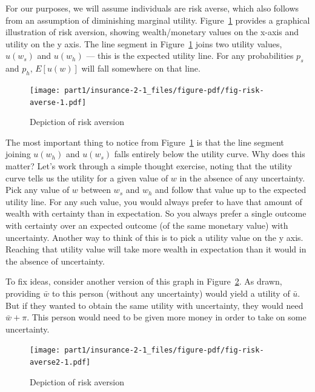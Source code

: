\documentclass[
  letterpaper,
  DIV=11,
  numbers=noendperiod]{scrreport}
\theoremstyle{definition}
\theoremstyle{remark}
\begin{document}
For our purposes, we will assume individuals are risk averse, which also
follows from an assumption of diminishing marginal utility.
Figure~\ref{fig-risk-averse} provides a graphical illustration of risk
aversion, showing wealth/monetary values on the x-axis and utility on
the y axis. The line segment in Figure~\ref{fig-risk-averse} joins two
utility values, \(u(w_{s})\) and \(u(w_{h})\) --- this is the expected
utility line. For any probabilities \(p_{s}\) and \(p_{h}\), \(E[u(w)]\)
will fall somewhere on that line.

\begin{figure}

{\centering \texttt{[image: part1/insurance-2-1\_files/figure-pdf/fig-risk-averse-1.pdf]}

}

\caption{\label{fig-risk-averse}Depiction of risk aversion}

\end{figure}

The most important thing to notice from Figure~\ref{fig-risk-averse} is
that the line segment joining \(u(w_{h})\) and \(u(w_{s})\) falls
entirely below the utility curve. Why does this matter? Let's work
through a simple thought exercise, noting that the utility curve tells
us the utility for a given value of \(w\) in the absence of any
uncertainty. Pick any value of \(w\) between \(w_{s}\) and \(w_{h}\) and
follow that value up to the expected utility line. For any such value,
you would always prefer to have that amount of wealth with certainty
than in expectation. So you always prefer a single outcome with
certainty over an expected outcome (of the same monetary value) with
uncertainty. Another way to think of this is to pick a utility value on
the y axis. Reaching that utility value will take more wealth in
expectation than it would in the absence of uncertainty.

To fix ideas, consider another version of this graph in
Figure~\ref{fig-risk-averse2}. As drawn, providing \(\bar{w}\) to this
person (without any uncertainty) would yield a utility of \(\bar{u}\).
But if they wanted to obtain the same utility with uncertainty, they
would need \(\bar{w} + \pi\). This person would need to be given more
money in order to take on some uncertainty.

\begin{figure}

{\centering \texttt{[image: part1/insurance-2-1\_files/figure-pdf/fig-risk-averse2-1.pdf]}

}

\caption{\label{fig-risk-averse2}Depiction of risk aversion}

\end{figure}
\end{document}
